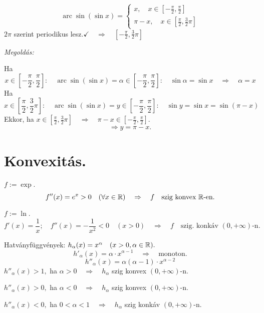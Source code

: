 \documentclass[a4paper,11.5pt]{article}
\DeclareMathOperator{\arc}{arc}
\begin{document}
	\begin{task}
		\[ \arc\sin(\sin x)=\left\{\begin{gathered}
			x,\quad x\in\left[-\frac{\pi}{2},\frac{\pi}{2}\right]\\
			\pi-x,\quad x\in\left[\frac{\pi}{2},\frac{3}{2}\pi \right]
		\end{gathered}\right. \]
		$2\pi$ szerint periodikus lesz.$\checkmark\quad \Rightarrow\quad \left[-\frac{\pi}{2},\frac{3}{2}\pi\right]$
			
		\textit{Megoldás:}
		
		Ha \[x\in\left[-\frac{\pi}{2},\frac{\pi}{2}\right]:\quad \arc\sin(\sin x)=\alpha\in\left[-\frac{\pi}{2},\frac{\pi}{2}\right]:\quad \sin\alpha=\sin x\quad \Rightarrow\quad \alpha = x\]
		Ha \[x\in\left[\frac{\pi}{2},\frac{3}{2}\pi\right]:\quad \arc\sin(\sin x)=y\in\left[-\frac{\pi}{2},\frac{\pi}{2}\right]:\quad \sin y=\sin x= \sin(\pi-x) \]
		Ekkor, ha $x\in\left[\frac{\pi}{2},\frac{3}{2}\pi\right]\quad \Rightarrow\quad \pi-x\in\left[-\frac{\pi}{2},\frac{\pi}{2}\right]$.
		\[ \Rightarrow y=\pi-x. \]
	\end{task}
	\section{Konvexitás.}
	\begin{task}
		$f:=\exp$.
		\[ f''(x)=e^x>0\quad (\forall x\in\mathbb{R})\quad \Rightarrow\quad f\quad \text{szig konvex $\mathbb{R}$-en.} \]
	\end{task}
	\begin{task}
		$f:=\ln$.
		\[ f'(x)=\frac{1}{x};\quad f''(x)=-\frac{1}{x^2}<0\quad (x>0)\quad \Rightarrow\quad f\quad \text{szig. konkáv $(0,+\infty)$-n.} \]
	\end{task}
	\begin{task} Hatványfüggvények: $h_\alpha(x)=x^\alpha\quad (x>0, \alpha\in\mathbb{R}).$
		\[ h'_\alpha(x)=\alpha\cdot x^{\alpha-1}\quad \Rightarrow\quad \text{monoton.} \]
		\[ h''_\alpha(x)=\alpha(\alpha-1)\cdot x^{\alpha-2}\]
		$h''_\alpha(x)>1,$ ha $\alpha>0\quad \Rightarrow\quad h_\alpha$ szig konvex $(0,+\infty)$-n.
		
		$h''_\alpha(x)>0,$ ha $\alpha<0\quad \Rightarrow\quad h_\alpha$ szig konvex $(0,+\infty)$-n.
		
		$h''_\alpha(x)<0,$ ha $0<\alpha<1\quad \Rightarrow\quad h_\alpha$ szig konkáv $(0,+\infty)$-n.
	\end{task}
\end{document}
